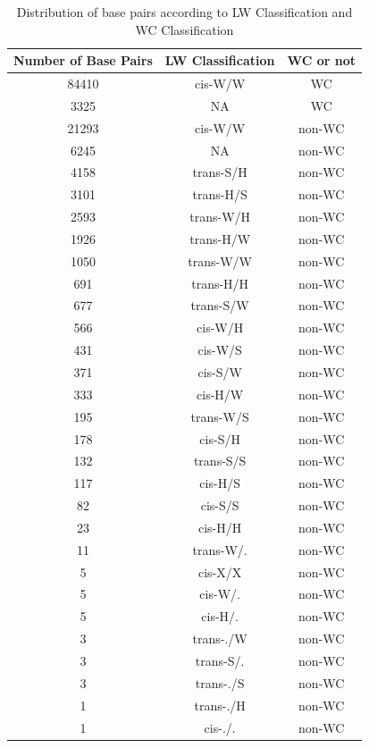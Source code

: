 \begin{center}
\begin{longtable}{c|c|c}
\caption{Distribution of base pairs according to LW Classification and WC Classification}\\ \hline
\bf{Number of Base Pairs} & \bf{LW Classification} & \bf{WC or not} \\ \hline \hline
84410 & cis-W/W & WC \\  \hline
3325 & NA & WC \\  \hline
21293 & cis-W/W & non-WC \\  \hline
6245 & NA & non-WC \\  \hline
4158 & trans-S/H & non-WC \\  \hline
3101 & trans-H/S & non-WC \\  \hline
2593 & trans-W/H & non-WC \\  \hline
1926 & trans-H/W & non-WC \\  \hline
1050 & trans-W/W & non-WC \\  \hline
691 & trans-H/H & non-WC \\  \hline
677 & trans-S/W & non-WC \\  \hline
566 & cis-W/H & non-WC \\  \hline
431 & cis-W/S & non-WC \\  \hline
371 & cis-S/W & non-WC \\  \hline
333 & cis-H/W & non-WC \\  \hline
195 & trans-W/S & non-WC \\  \hline
178 & cis-S/H & non-WC \\  \hline
132 & trans-S/S & non-WC \\  \hline
117 & cis-H/S & non-WC \\  \hline
82 & cis-S/S & non-WC \\  \hline
23 & cis-H/H & non-WC \\  \hline
11 & trans-W/. & non-WC \\  \hline
5 & cis-X/X & non-WC \\  \hline
5 & cis-W/. & non-WC \\  \hline
5 & cis-H/. & non-WC \\  \hline
3 & trans-./W & non-WC \\  \hline
3 & trans-S/. & non-WC \\  \hline
3 & trans-./S & non-WC \\  \hline
1 & trans-./H & non-WC \\  \hline
1 & cis-./. & non-WC \\  \hline
\end{longtable}
\end{center}

